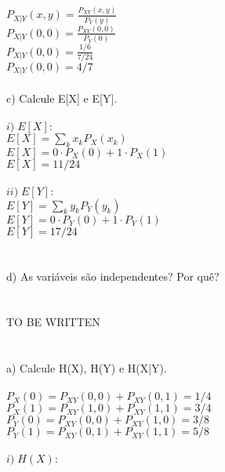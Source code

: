 \documentclass[a4paper]{article}
\begin{document}
$ \displaystyle P_{X|Y}(x,y) = \frac{P_{XY}(x,y)}{P_Y(y)}   $\\
$ \displaystyle P_{X|Y}(0,0) = \frac{P_{XY}(0,0)}{P_Y(0)}   $\\
$ P_{X|Y}(0,0) = \frac{1/6}{7/24}                           $\\
$ \boxed{ P_{X|Y}(0,0) = 4/7 }                              $\\
\\
c) Calcule E[X] e E[Y].                         \\
\\
$ i) \; E[X]:                                  $\\
$ \displaystyle E[X] = \sum_{k} x_k P_X(x_k)   $\\
$ E[X] = 0 \cdot P_X(0) + 1 \cdot P_X(1)       $\\
$ \boxed{ E[X] = 11/24 }                       $\\
\\
$ ii) \; E[Y]:                                 $\\
$ \displaystyle E[Y] = \sum_{k} y_k P_Y(y_k)   $\\
$ E[Y] = 0 \cdot P_Y(0) + 1 \cdot P_Y(1)       $\\
$ \boxed{ E[Y] = 17/24 }                       $\\
\\
\\
d) As variáveis são independentes? Por quê?
\\
\\
\\
TO BE WRITTEN
\\
\\
\\
a) Calcule H(X), H(Y) e H(X|Y).                 \\
\\
$ P_X(0) = P_{XY}(0,0) + P_{XY}(0,1) = 1/4     $\\
$ P_X(1) = P_{XY}(1,0) + P_{XY}(1,1) = 3/4     $\\
$ P_Y(0) = P_{XY}(0,0) + P_{XY}(1,0) = 3/8     $\\
$ P_Y(1) = P_{XY}(0,1) + P_{XY}(1,1) = 5/8     $\\
\\
$ i) \; H(X):                                               $\\
\end{document}

